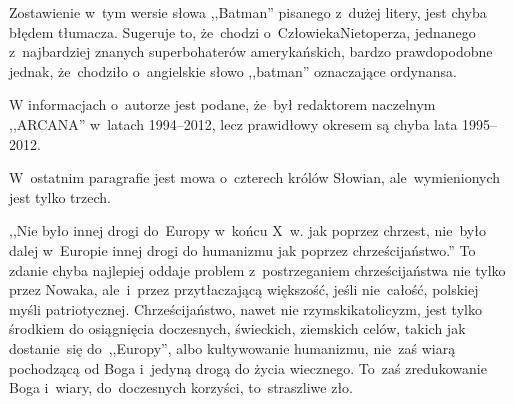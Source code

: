 \documentclass[a4paper,11pt]{article}
\begin{document}
\start {} Zostawienie w~tym wersie słowa ,,Batman''
pisanego z~dużej litery, jest chyba błędem tłumacza. Sugeruje to,
że~chodzi o~Człowieka\dywiz Nietoperza, jednanego z~najbardziej
znanych superbohaterów amerykańskich, bardzo prawdopodobne jednak,
że~chodziło o~angielskie słowo ,,batman'' oznaczające ordynansa.


\vspace{\spaceTwo}








\start {} W informacjach o~autorze jest podane,
że~był redaktorem naczelnym ,,ARCANA'' w~latach 1994--2012, lecz
prawidłowy okresem są chyba lata 1995--2012.

\vspace{\spaceFour}


\start {} W~ostatnim paragrafie jest mowa o~czterech królów
Słowian, ale~wymienionych jest tylko trzech.

\vspace{\spaceFour}


\start {} ,,Nie było innej drogi do~Europy w~końcu X~w.
jak poprzez chrzest, nie~było dalej w~Europie innej drogi do humanizmu
jak poprzez chrześcijaństwo.'' To zdanie chyba najlepiej oddaje
problem z~postrzeganiem chrześcijaństwa nie tylko przez Nowaka,
ale~i~przez przytłaczającą większość, jeśli nie~całość, polskiej myśli
patriotycznej. Chrześcijaństwo, nawet nie rzymski\dywiz katolicyzm,
jest tylko środkiem do osiągnięcia doczesnych, świeckich, ziemskich
celów, takich jak dostanie~się do~,,Europy'', albo kultywowanie
humanizmu, nie~zaś wiarą pochodzącą od Boga i~jedyną drogą do życia
wiecznego. To~zaś zredukowanie Boga i~wiary, do~doczesnych korzyści,
to~straszliwe zło.
\end{document}

